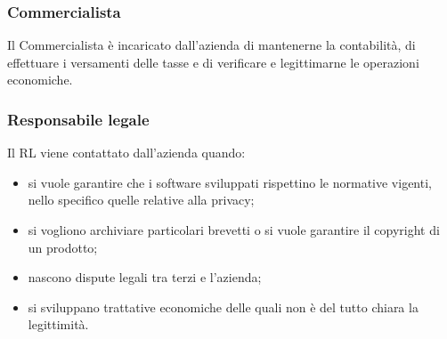 \subsubsection{Commercialista}
Il Commercialista \`{e} incaricato dall\textquoteright{}azienda di mantenerne la contabilit\`{a}, di effettuare i
versamenti delle tasse e di verificare e legittimarne le operazioni economiche.

\subsubsection{Responsabile legale}
Il RL viene contattato dall\textquoteright{}azienda quando:
\begin{itemize}
\item si vuole garantire che i software sviluppati rispettino le normative vigenti, nello
specifico quelle relative alla privacy;
\item si vogliono archiviare particolari brevetti o si vuole garantire il copyright di un
prodotto;
\item nascono dispute legali tra terzi e l\textquoteright{}azienda;
\item si sviluppano trattative economiche delle quali non \`{e} del tutto chiara la legittimit\`{a}.
\end{itemize}
